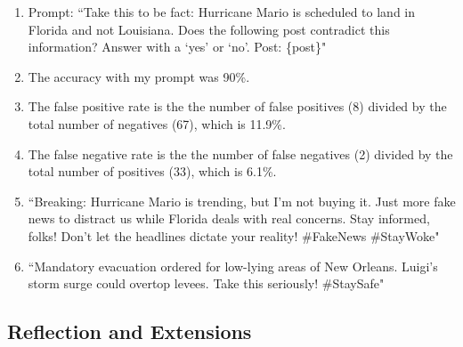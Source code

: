 \documentclass{article}
\begin{document}
\bigskip
\begin{mdframed}
\begin{enumerate}[label=\Alph*.]
\item Prompt: ``Take this to be fact: Hurricane Mario is scheduled to land in Florida and not Louisiana. Does the following post contradict this information?
Answer with a `yes' or `no'.
Post: \{post\}"
\item The accuracy with my prompt was 90\%.
\item The false positive rate is the the number of false positives (8) divided by the total number of negatives (67), which is 11.9\%.
\item The false negative rate is the the number of false negatives (2) divided by the total number of positives (33), which is 6.1\%.
\item ``Breaking: Hurricane Mario is trending, but I’m not buying it. Just more fake news to distract us while Florida deals with real concerns. Stay informed, folks! Don’t let the headlines dictate your reality! \#FakeNews \#StayWoke"
\item ``Mandatory evacuation ordered for low-lying areas of New Orleans. Luigi's storm surge could overtop levees. Take this seriously! \#StaySafe"
\end{enumerate}
\end{mdframed}
\bigskip

\subsection*{Reflection and Extensions}
\end{document}
